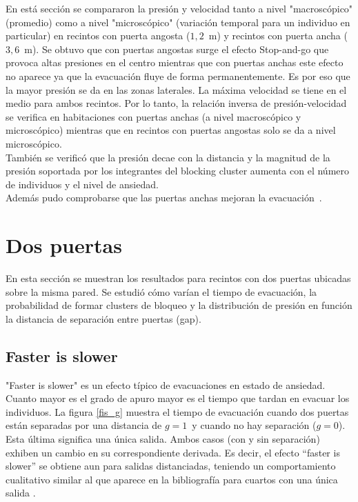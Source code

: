 En está sección se compararon la presión y velocidad tanto a nivel "macroscópico" (promedio) como a nivel "microscópico" (variación temporal para un individuo en particular) en recintos con puerta angosta ($1,2$~m) y recintos con puerta ancha ($3,6$~m). Se obtuvo que con puertas angostas surge el efecto Stop-and-go que provoca altas presiones en el centro mientras que con puertas anchas este efecto no aparece ya que la evacuación fluye de forma permanentemente. Es por eso que la mayor presión se da en las zonas laterales. La máxima velocidad se tiene en el medio para ambos recintos. Por lo tanto, la relación inversa de presión-velocidad se verifica en habitaciones con puertas anchas (a nivel macroscópico y microscópico) mientras que en recintos con puertas angostas solo se da a nivel microscópico.\\
También se verificó que la presión decae con la distancia y la magnitud de la presión soportada por los integrantes del blocking cluster aumenta con el número de individuos y el nivel de ansiedad.\\
Además pudo comprobarse que las puertas anchas mejoran la evacuación~\cite{huanhuan1}.  

\newpage

\section{Dos puertas}

En esta sección se muestran los resultados para recintos con dos puertas ubicadas sobre la misma pared. Se estudió cómo varían el tiempo de evacuación, la probabilidad de formar clusters de bloqueo y la distribución de presión en función la distancia de separación entre puertas (gap).  

\subsection{Faster is slower}

"Faster is slower" es un efecto típico de evacuaciones en estado de ansiedad. Cuanto mayor es el grado de apuro mayor es el tiempo que tardan en evacuar los individuos. 
La figura \ref{fis_g} muestra el tiempo de evacuación cuando dos puertas están separadas por una distancia de $g=1\,$ 
y cuando no hay separación ($g=0$). Esta última significa una única salida. Ambos casos (con y sin separación) exhiben un cambio en su correspondiente derivada. Es decir, el efecto ``faster is slower'' se obtiene aun para salidas distanciadas, teniendo un comportamiento cualitativo similar al que aparece en la bibliografía para cuartos con una única salida \cite{Helbing1,Dorso1}.\\ 

